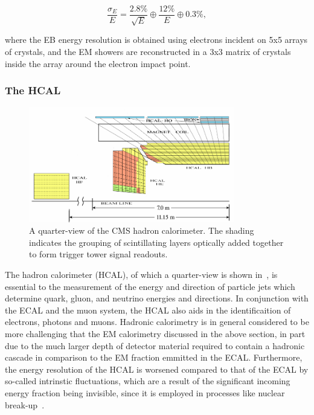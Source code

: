 \begin{equation}
 \frac{\sigma_{E}}{E} = \frac{2.8\%}{\sqrt{E}} \oplus \frac{12\%}{E} \oplus 0.3\%,
\end{equation}

where the EB energy resolution is obtained using electrons incident on 5x5 arrays of crystals, and the EM showers are reconstructed in a 3x3 matrix of crystals inside the array around the electron impact point. 

\subsubsection{The HCAL}
\label{subsubsec:HCAL}

\begin{figure}
  \centering
  \includegraphics[width=0.8\textwidth]{figs/quarterHCAL}
  \caption{A quarter-view of the CMS hadron calorimeter. The shading indicates the grouping of scintillating layers optically added together to form trigger tower signal readouts.~\cite{Chatrchyan:2009hy}}
  \label{fig:hcal}
\end{figure}

The hadron calorimeter (HCAL), of which a quarter-view is shown in~, is essential to the measurement of the energy and direction of particle jets which determine quark, gluon, and neutrino energies and directions. In conjunction with the ECAL and the muon system, the HCAL also aids in the identificaition of electrons, photons and muons. Hadronic calorimetry is in general considered to be more challenging that the EM calorimetry discussed in the above section, in part due to the much larger depth of detector material required to contain a hadronic cascade in comparison to the EM fraction emmitted in the ECAL. Furthermore, the energy resolution of the HCAL is worsened compared to that of the ECAL by so-called intrinstic fluctuations, which are a result of the significant incoming energy fraction being invisible, since it is employed in processes like nuclear break-up~\cite{Leroy:2004zza}. 

